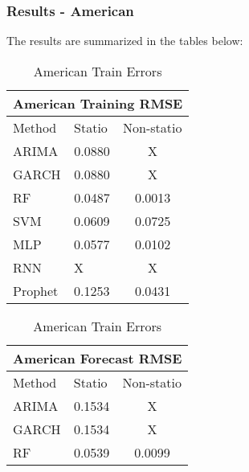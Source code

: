 \documentclass{beamer}
\begin{document}
	\begin{frame}
		\frametitle{Results - American}
		The results are summarized in the tables below:
		
		\begin{table}
			\parbox{.45\linewidth}{
				\centering
				\begin{tabular}{|lll|}
					\hline
					\multicolumn{3}{|c|}{American Training RMSE}                                                  \\ \hline
					\multicolumn{1}{|l|}{Method}  & \multicolumn{1}{l|}{Statio} & Non-statio             \\ \hline
					\multicolumn{1}{|l|}{ARIMA}   & \multicolumn{1}{c|}{0.0880}       & \multicolumn{1}{c|}{X} \\ \hline
					\multicolumn{1}{|l|}{GARCH}   & \multicolumn{1}{c|}{0.0880}       & \multicolumn{1}{c|}{X} \\ \hline
					\multicolumn{1}{|l|}{RF}      & \multicolumn{1}{c|}{0.0487}       & \multicolumn{1}{c|}{0.0013}  \\ \hline
					\multicolumn{1}{|l|}{SVM}     & \multicolumn{1}{l|}{0.0609}       & \multicolumn{1}{c|}{0.0725}  \\ \hline
					\multicolumn{1}{|l|}{MLP}     & \multicolumn{1}{l|}{0.0577}       & \multicolumn{1}{c|}{0.0102}  \\ \hline
					\multicolumn{1}{|l|}{RNN}     & \multicolumn{1}{l|}{X}       & \multicolumn{1}{c|}{X}  \\ \hline
					\multicolumn{1}{|l|}{Prophet} & \multicolumn{1}{l|}{0.1253}       & \multicolumn{1}{c|}{0.0431}  \\ \hline
				\end{tabular}
				\caption{American Train Errors}
			}
			\hfill
			\parbox{.45\linewidth}{
				\centering
				\begin{tabular}{|lll|}
					\hline
					\multicolumn{3}{|c|}{American Forecast RMSE}                                                  \\ \hline
					\multicolumn{1}{|l|}{Method}  & \multicolumn{1}{l|}{Statio} & Non-statio             \\ \hline
					\multicolumn{1}{|l|}{ARIMA}   & \multicolumn{1}{c|}{0.1534}       & \multicolumn{1}{c|}{X} \\ \hline
					\multicolumn{1}{|l|}{GARCH}   & \multicolumn{1}{c|}{0.1534}       & \multicolumn{1}{c|}{X} \\ \hline
					\multicolumn{1}{|l|}{RF}      & \multicolumn{1}{c|}{0.0539}       & \multicolumn{1}{c|}{0.0099}  \\ \hline

\end{tabular}}
\end{table}
\end{frame}
\end{document}
